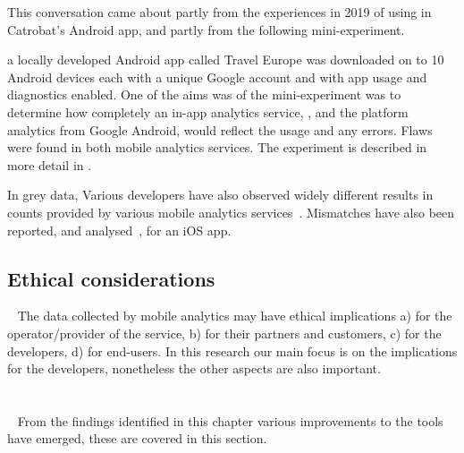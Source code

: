 This conversation came about partly from the experiences in 2019 of using  in Catrobat's  Android app, and partly from the following mini-experiment. 

a locally developed Android app called Travel Europe was downloaded on to 10 Android devices each with a unique Google account and with app usage and diagnostics enabled. One of the aims was of the mini-experiment was to determine how completely an in-app analytics service, , and the platform analytics from Google Android, would reflect the usage and any errors. Flaws were found in both mobile analytics services. The experiment is described in more detail in .

In grey data, Various developers have also observed widely different results in counts provided by various mobile analytics services~. Mismatches have also been reported, and analysed~, for an iOS app. %


\subsection{Ethical considerations}~\label{tata-ethical-considerations-topic}
The data collected by mobile analytics may have ethical implications a) for the operator/provider of the service, b) for their partners and customers, c) for the developers, d) for end-users. In this research our main focus is on the implications for the developers, nonetheless the other aspects are also important.

\section{\itools}~\label{tata-itools-section}
From the findings identified in this chapter various improvements to the tools have emerged, these are covered in this section.


